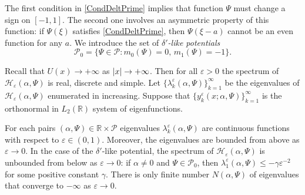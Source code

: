 \documentclass[11pt,english]{amsart}%
\begin{document}
The first condition in \eqref{CondDeltPrime} implies that function $\Psi$ must change a sign on $[-1,1]$. The second one involves an asymmetric property of  this function: if $\Psi(\xi)$ satisfies \eqref{CondDeltPrime}, then $\Psi(\xi-a)$ cannot be an even function for any $a$.
We introduce the set of \emph{$\delta'$-like potentials}
$$\mathcal{P}_0=\{\Psi\in \mathcal{P}\colon m_0(\Psi)=0,\, m_1(\Psi)=-1 \}.$$


Recall that $U(x)\to +\infty$ as $\left\vert x\right\vert\to +\infty$. Then for all $\varepsilon>0$ the spectrum of $\mathcal{H}_{\varepsilon}(\alpha,\Psi)$ is real, discrete and simple.
Let $\{\lambda_k^\varepsilon(\alpha, \Psi)\}_{k=1}^\infty$ be the eigenva\-lues of  $\mathcal{H}_{\varepsilon}(\alpha,\Psi)$ enumerated in increasing. Suppose that $\{y_k^\varepsilon(x;\alpha, \Psi)\}_{k=1}^\infty$ is the orthonormal in $L_2(\mathbb{R})$ system of eigenfunctions.
\begin{g_theorem}\label{TheoremNeg}
For each pairs $(\alpha,\Psi)\in \mathbb{R}\times \mathcal{P}$  eigenvalues  $\lambda_k^\varepsilon(\alpha, \Psi)$ are continuous functions with respect to $\varepsilon \in (0,1)$.
Moreover, the eigenvalues are bounded from above as $\varepsilon\to 0$.
In the case of the $\delta'$-like potential, the spectrum of $\mathcal{H_{\varepsilon}}(\alpha,\Psi)$ is unbounded from below as $\varepsilon\to 0$: if $\alpha\neq 0$ and $\Psi\in \mathcal{P}_0$, then $\lambda_1^\varepsilon(\alpha, \Psi)\leq -\gamma\varepsilon^{-2}$
for some positive constant $\gamma$. There is only finite number $N(\alpha,\Psi)$ of eigenvalues that converge to $-\infty$ as $\varepsilon\to 0$.
\end{g_theorem}
\end{document}
